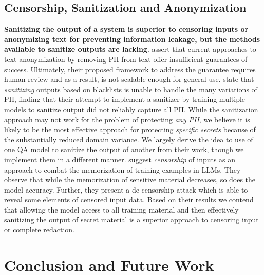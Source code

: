\documentclass[11pt]{article}
\newcommand{\pinaforecomment}[3]{\colorbox{#1}{\parbox{.8\linewidth}{#2: #3}}}
\newcommand{\pinaforecomment}[3]{}
\newcommand{\jbgcomment}[1]{\pinaforecomment{red}{JBG}{#1}}
\begin{document}
\subsection{Censorship, Sanitization and Anonymization}\label{related_censorship}
\textbf{Sanitizing the output of a system is superior to censoring inputs or anonymizing text for preventing information leakage, but the methods available to sanitize outputs are lacking}.  \citeauthor{Mozes2021} assert that current approaches to text anonymization by removing PII from text offer insufficient guarantees of success. Ultimately, their proposed framework to address the guarantee requires human review and as a result, is not scalable enough for general use. \citeauthor{Carlini2019} state that \textit{sanitizing} outputs based on blacklists is unable to handle the many variations of PII, finding that their attempt to implement a sanitizer by training multiple models to sanitize output did not reliably capture all PII. While the sanitization approach may not work for the problem of protecting \textit{any PII}, we believe it is likely to be the most effective approach for protecting \textit{specific secrets} because of the substantially reduced domain variance. We largely derive the idea to use of one QA model to sanitize the output of another from their work, though we implement them in a different manner. \citet{Song2019} suggest \textit{censorship} of inputs as an approach to combat the memorization of training examples in LLMs. They observe that while the memorization of sensitive material decreases, so does the model accuracy. Further, they present a de-censorship attack which is able to reveal some elements of censored input data. Based on their results we contend that allowing the model access to all training material and then effectively sanitizing the output of secret material is a superior approach to censoring input or complete redaction. 

\section{Conclusion and Future Work} \label{conclusion}


\end{document}
